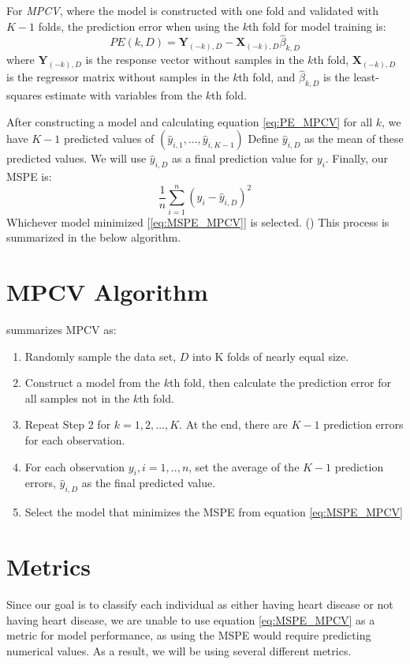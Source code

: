 \documentclass[letter]{article}
\begin{document}
For \textit{MPCV}, where the model is constructed with one fold and validated with \(K-1\) folds, the prediction error when using the \(k\)th fold for model training is:
\begin{equation}\label{eq:PE_MPCV}
	PE(k,D) = \textbf{Y}_{(-k),D}-\textbf{X}_{(-k),D}\hat \beta_{k,D}
\end{equation}
where \(\textbf{Y}_{(-k),D}\) is the response vector without samples in the \(k\)th fold, \(\textbf{X}_{(-k),D}\) is the regressor matrix without samples in the \(k\)th fold, and \(\hat \beta_{k,D}\) is the least-squares estimate with variables from the \(k\)th fold.

After constructing a model and calculating equation \ref{eq:PE_MPCV} for all \(k\), we have \(K-1\) predicted values of \((\hat{y}_{i,1},..., \hat{y}_{i,K-1})\)
Define \(\hat{y}_{i,D}\) as the mean of these predicted values.  We will use \(\hat{y}_{i,D}\) as a final prediction value for \(y_i\).  Finally, our MSPE is:
\begin{equation}\label{eq:MSPE_MPCV}
	\frac{1}{n}\sum_{i=1}^{n}(y_i-\hat y_{i,D})^2
\end{equation}
Whichever model minimized [\ref{eq:MSPE_MPCV}] is selected.  (\cite{yoonsuhmulpred}) This process is summarized in the below algorithm.

\section{MPCV Algorithm}
\cite{yoonsuhmulpred} summarizes MPCV as:
\begin{enumerate}
	\item Randomly sample the data set, \(D\) into K folds of nearly equal size.
	\item Construct a model from the \(k\)th fold, then calculate the prediction error for all samples not in the \(k\)th fold.
	\item Repeat Step 2 for \(k=1, 2, ..., K\).  At the end, there are \(K-1\) prediction errors for each observation.
	\item For each observation \(y_i, i=1,..,n\), set the average of the \(K-1\) prediction errors, \(\hat y_{i,D}\) as the final predicted value.
	\item Select the model that minimizes the MSPE from equation \ref{eq:MSPE_MPCV}
\end{enumerate}

\section{Metrics}
Since our goal is to classify each individual as either having heart disease or not having heart disease, we are unable to use equation \ref{eq:MSPE_MPCV}
as a metric for model performance, as using the MSPE would require predicting numerical values.  As a result, we will be using several different metrics.
\end{document}
